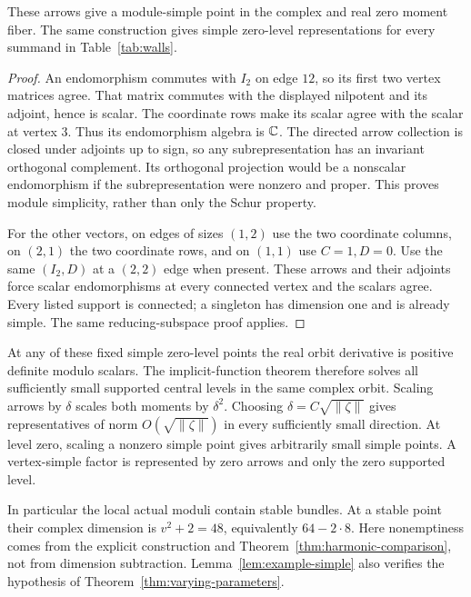 \begin{lemma}\label{lem:example-simple}
These arrows give a module-simple point in the complex and real
zero moment fiber. The same construction gives simple zero-level
representations for every summand in Table~\ref{tab:walls}.
\end{lemma}
\begin{proof}
An endomorphism commutes with $I_2$ on edge $12$, so its first two
vertex matrices agree. That matrix commutes with the displayed
nilpotent and its adjoint, hence is scalar. The coordinate rows
make its scalar agree with the scalar at vertex $3$.
Thus its endomorphism algebra is $\mathbb C$.
The directed arrow collection is closed under adjoints up to sign,
so any subrepresentation has an invariant orthogonal complement.
Its orthogonal projection would be a nonscalar endomorphism if
the subrepresentation were nonzero and proper. This proves
module simplicity, rather than only the Schur property.

For the other vectors, on edges of sizes $(1,2)$ use the two
coordinate columns, on $(2,1)$ the two coordinate rows, and on
$(1,1)$ use $C=1,D=0$. Use the same $(I_2,D)$ at a $(2,2)$
edge when present. These arrows and their adjoints force scalar
endomorphisms at every connected vertex and the scalars agree.
Every listed support is connected; a singleton has dimension one
and is already simple. The same reducing-subspace proof applies.
\end{proof}

At any of these fixed simple zero-level points the real orbit
derivative is positive definite modulo scalars. The implicit-function
theorem therefore solves all sufficiently small supported central
levels in the same complex orbit. Scaling arrows by $\delta$
scales both moments by $\delta^2$. Choosing
$\delta=C\sqrt{\|\zeta\|}$ gives representatives of norm
$O(\sqrt{\|\zeta\|})$ in every sufficiently small direction.
At level zero, scaling a nonzero simple point gives arbitrarily
small simple points. A vertex-simple factor is represented by zero arrows and
only the zero supported level.

In particular the local actual moduli contain stable bundles.
At a stable point their complex dimension is
$v^2+2=48$, equivalently $64-2\cdot8$.
Here nonemptiness comes from the explicit construction and
Theorem~\ref{thm:harmonic-comparison}, not from dimension subtraction.
Lemma~\ref{lem:example-simple} also verifies the hypothesis of
Theorem~\ref{thm:varying-parameters}.

